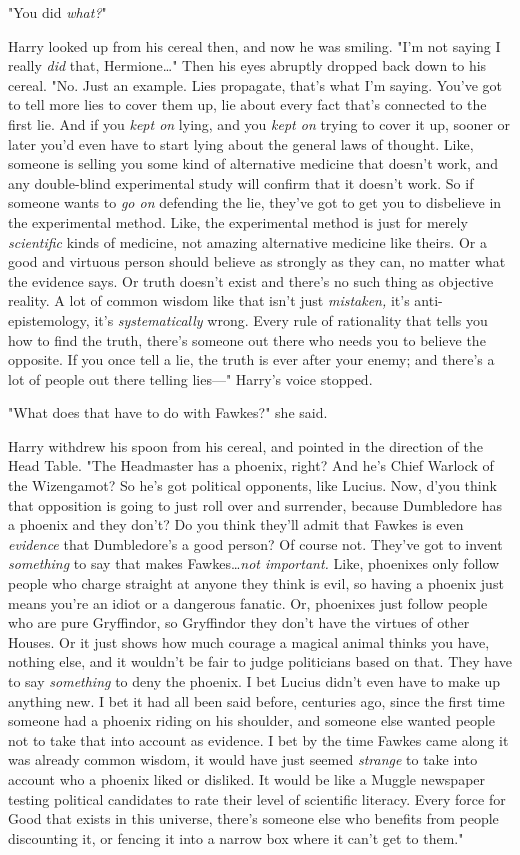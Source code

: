 "You did \emph{what?}"

Harry looked up from his cereal then, and now he was smiling. "I’m not saying I
really \emph{did} that, Hermione…" Then his eyes abruptly dropped back
down to his cereal. "No. Just an example. Lies propagate, that’s what I’m
saying. You’ve got to tell more lies to cover them up, lie about every fact
that’s connected to the first lie. And if you \emph{kept on} lying, and you
\emph{kept on} trying to cover it up, sooner or later you’d even have to start
lying about the general laws of thought. Like, someone is selling you some kind
of alternative medicine that doesn’t work, and any double-blind experimental
study will confirm that it doesn’t work. So if someone wants to \emph{go on}
defending the lie, they’ve got to get you to disbelieve in the experimental
method. Like, the experimental method is just for merely \emph{scientific}
kinds of medicine, not amazing alternative medicine like theirs. Or a good and
virtuous person should believe as strongly as they can, no matter what the
evidence says. Or truth doesn’t exist and there’s no such thing as objective
reality. A lot of common wisdom like that isn’t just \emph{mistaken,} it’s
anti-epistemology, it’s \emph{systematically} wrong. Every rule of rationality
that tells you how to find the truth, there’s someone out there who needs you
to believe the opposite. If you once tell a lie, the truth is ever after your
enemy; and there’s a lot of people out there telling lies—" Harry’s voice
stopped.

"What does that have to do with Fawkes?" she said.

Harry withdrew his spoon from his cereal, and pointed in the direction of the
Head Table. "The Headmaster has a phoenix, right? And he’s Chief Warlock of the
Wizengamot? So he’s got political opponents, like Lucius. Now, d’you think that
opposition is going to just roll over and surrender, because Dumbledore has a
phoenix and they don’t? Do you think they’ll admit that Fawkes is even
\emph{evidence} that Dumbledore’s a good person? Of course not. They’ve got to
invent \emph{something} to say that makes Fawkes…\emph{not important.}
Like, phoenixes only follow people who charge straight at anyone they think is
evil, so having a phoenix just means you’re an idiot or a dangerous fanatic.
Or, phoenixes just follow people who are pure Gryffindor, so Gryffindor they
don’t have the virtues of other Houses. Or it just shows how much courage a
magical animal thinks you have, nothing else, and it wouldn’t be fair to judge
politicians based on that. They have to say \emph{something} to deny the
phoenix. I bet Lucius didn’t even have to make up anything new. I bet it had
all been said before, centuries ago, since the first time someone had a phoenix
riding on his shoulder, and someone else wanted people not to take that into
account as evidence. I bet by the time Fawkes came along it was already common
wisdom, it would have just seemed \emph{strange} to take into account who a
phoenix liked or disliked. It would be like a Muggle newspaper testing
political candidates to rate their level of scientific literacy. Every force
for Good that exists in this universe, there’s someone else who benefits from
people discounting it, or fencing it into a narrow box where it can’t get to
them."

